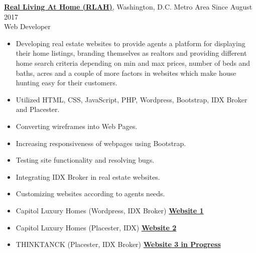 \documentclass[margin,line]{res}
\begin{document}
\begin{resume}
\href{http://www.rlathome.com/}{\bf Real Living At Home (RLAH)}, Washington, D.C. Metro Area \hfill{Since August 2017}\\
Web Developer
\begin{itemize} \itemsep -2pt  %
 \item Developing real estate websites to provide agents a platform for displaying their home listings, branding themselves as realtors and providing different home search criteria depending on min and max prices, number of beds and baths, acres and a couple of more factors in websites which make house hunting easy for their customers. 
 \item Utilized HTML, CSS, JavaScript, PHP, Wordpress, Bootstrap, IDX Broker and Placester.
 \item Converting wireframes into Web Pages.
 \item Increasing responsiveness of webpages using Bootstrap.
 \item Testing site functionality and resolving bugs.
 \item Integrating IDX Broker in real estate websites.
 \item Customizing websites according to agents needs.
 \item Capitol Luxury Homes (Wordpress, IDX Broker) \href{http://dev.capitolluxuryhomes.com/}{\bf Website 1}
 \item Capitol Luxury Homes (Placester, IDX) \href{http://bit.ly/2gMSN8T}{\bf Website 2}
 \item THINKTANCK (Placester, IDX Broker) \href{http://justinlevitch2.myrealestateplatform.com}{\bf Website 3 in Progress}


 \end{itemize}


\end{resume}
\end{document}
